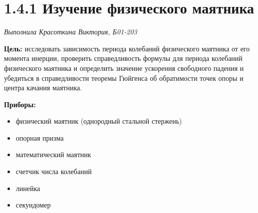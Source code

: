 \documentclass[12pt]{article}
\begin{document}
	\section*{1.4.1 Изучение физического маятника}
	\textit{Выполнила Красоткина Виктория, Б01-203}
	
	\textbf{Цель:} исследовать зависимость периода колебаний физического маятника от его момента инерции, проверить справедливость формулы для периода колебаний физического маятника и определить значение ускорения свободного падения и убедиться в справедливости теоремы Гюйгенса об обратимости	точек опоры и центра качания маятника.
	
	\textbf{Приборы:}
	
	\begin{itemize}
		\item физический маятник (однородный стальной стержень)
		\item опорная призма
		\item математический маятник
		\item счетчик числа колебаний
		\item линейка
		\item секундомер
	\end{itemize}
\end{document}
